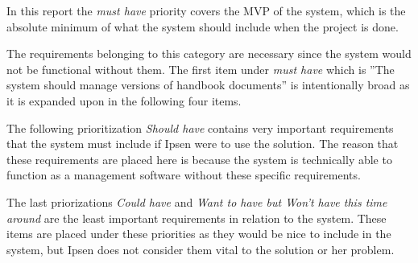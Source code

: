 In this report the \textit{must have} priority covers the MVP of the system, which is the absolute minimum of what the system should include when the project is done.

The requirements belonging to this category are necessary since the system would not be functional without them.
The first item under \textit{must have} which is ''The system should manage versions of handbook documents'' is intentionally broad as it is expanded upon in the following four items.

The following prioritization \textit{Should have} contains very important requirements that the system must include if Ipsen were to use the solution.
The reason that these requirements are placed here is because the system is technically able to function as a management software without these specific requirements.

The last priorizations \textit{Could have} and \textit{Want to have but Won't have this time around} are the least important requirements in relation to the system.
These items are placed under these priorities as they would be nice to include in the system, but Ipsen does not consider them vital to the solution or her problem.
